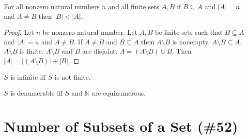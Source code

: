 \documentclass{article}
\begin{document}
\begin{forthel}
\begin{lemma}
	For all nonzero natural numbers $n$ and all finite sets $A, B$
	if $B \subseteq A$ and $|A| = n$ and $A \neq B$
	then $|B| < |A|$.
\end{lemma}
\begin{proof}
	Let $n$ be nonzero natural number.
	Let $A,B$ be finite sets such that 
	$B \subseteq A$ and $|A|=n$ and $A \neq B$.
	If $A \neq B$ and $B \subseteq A$ then
	$A \setminus B$ is nonempty.
	$A \setminus B \subseteq A$.
	$A \setminus B$ is finite.
	$A \setminus B$ and $B$ are disjoint.
	$A = (A \setminus B) \cup B$.
	Then $|A| = |(A \setminus B)| + |B|$.
\end{proof}

\begin{definition}
	$S$ is infinite iff $S$ is not finite.
\end{definition}

\begin{definition}
	$S$ is denumerable iff $S$ and $\mathbb{N}$ are equinumerous.
\end{definition}

\end{forthel}



  \section{Number of Subsets of a Set (\#52)}
  
\end{document}
